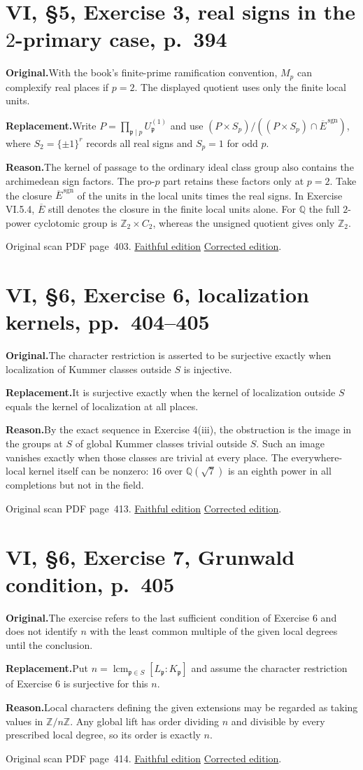 \documentclass[11pt,a4paper]{article}
\newcommand{\original}{\par\smallskip\noindent\textbf{Original.}\enspace}
\newcommand{\replacement}{\par\smallskip\noindent\textbf{Replacement.}\enspace}
\newcommand{\reason}{\par\smallskip\noindent\textbf{Reason.}\enspace}
\newcommand{\editionlink}[3]{\href{#1\#errata.#2}{#3}}
\newcommand{\location}[2]{%
  \par\smallskip\noindent Original scan PDF page~#2.\enspace
  \editionlink{Neukirch_Faithful.pdf}{#1}{Faithful edition}
  \quad\editionlink{Neukirch_Corrected.pdf}{#1}{Corrected edition}.}
\begin{document}
\setcounter{section}{136}
\section{VI, \S5, Exercise 3, real signs in the $2$-primary case, p.~394}\label{errata:item:137}

\original With the book\textquoteright{}s finite-prime ramification convention, $M_p$ can complexify real places if $p=2$. The displayed quotient uses only the finite local units.
\replacement Write $P=\prod_{\mathfrak p\mid p}U_{\mathfrak p}^{(1)}$ and use $(P\times S_p)/((P\times S_p)\cap\overline E^{\,\mathrm{sgn}})$, where $S_2=\{\pm1\}^r$ records all real signs and $S_p=1$ for odd $p$.
\reason The kernel of passage to the ordinary ideal class group also contains the archimedean sign factors. The pro-$p$ part retains these factors only at $p=2$. Take the closure $\overline E^{\,\mathrm{sgn}}$ of the units in the local units times the real signs. In Exercise VI.5.4, $\overline E$ still denotes the closure in the finite local units alone. For $\mathbb Q$ the full $2$-power cyclotomic group is $\mathbb Z_2\times C_2$, whereas the unsigned quotient gives only $\mathbb Z_2$.
\location{137}{403}

\setcounter{section}{137}
\section{VI, \S6, Exercise 6, localization kernels, pp.~404--405}\label{errata:item:138}

\original The character restriction is asserted to be surjective exactly when localization of Kummer classes outside $S$ is injective.
\replacement It is surjective exactly when the kernel of localization outside $S$ equals the kernel of localization at all places.
\reason By the exact sequence in Exercise 4(iii), the obstruction is the image in the groups at $S$ of global Kummer classes trivial outside $S$. Such an image vanishes exactly when those classes are trivial at every place. The everywhere-local kernel itself can be nonzero: $16$ over $\mathbb Q(\sqrt7)$ is an eighth power in all completions but not in the field.
\location{138}{413}

\setcounter{section}{138}
\section{VI, \S6, Exercise 7, Grunwald condition, p.~405}\label{errata:item:139}

\original The exercise refers to the last sufficient condition of Exercise 6 and does not identify $n$ with the least common multiple of the given local degrees until the conclusion.
\replacement Put $n=\operatorname{lcm}_{\mathfrak p\in S}[L_{\mathfrak p}:K_{\mathfrak p}]$ and assume the character restriction of Exercise 6 is surjective for this $n$.
\reason Local characters defining the given extensions may be regarded as taking values in $\mathbb Z/n\mathbb Z$. Any global lift has order dividing $n$ and divisible by every prescribed local degree, so its order is exactly $n$.
\location{139}{414}
\end{document}
